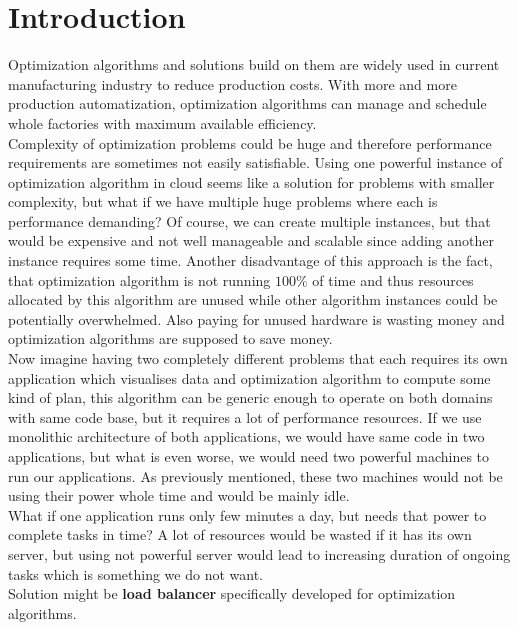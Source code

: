 
\chapter{Introduction}\label{ch:introduction}

Optimization algorithms and solutions build on them are widely used in current manufacturing industry to reduce production costs.
With more and more production automatization, optimization algorithms can manage and schedule whole factories with maximum available efficiency.\\
Complexity of optimization problems could be huge and therefore performance requirements are sometimes not easily satisfiable.
Using one powerful instance of optimization algorithm in cloud seems like a solution for problems with smaller complexity,
but what if we have multiple huge problems where each is performance demanding?
Of course, we can create multiple instances, but that would be expensive and not well manageable and scalable
since adding another instance requires some time.
Another disadvantage of this approach is the fact, that optimization algorithm is not running $100\%$ of time
and thus resources allocated by this algorithm are unused while other algorithm instances could be potentially overwhelmed.
Also paying for unused hardware is wasting money and optimization algorithms are supposed to save money.\\
Now imagine having two completely different problems that each requires its own application which visualises data
and optimization algorithm to compute some kind of plan,
this algorithm can be generic enough to operate on both domains with same code base, but it requires a lot of performance resources.
If we use monolithic architecture of both applications,
we would have same code in two applications,
but what is even worse, we would need two powerful machines to run our applications.
As previously mentioned, these two machines would not be using their power whole time and would be mainly idle.\\
What if one application runs only few minutes a day, but needs that power to complete tasks in time?
A lot of resources would be wasted if it has its own server,
but using not powerful server would lead to increasing duration of ongoing tasks which is something we do not want.\\
Solution might be \textbf{load balancer} specifically developed for optimization algorithms.







